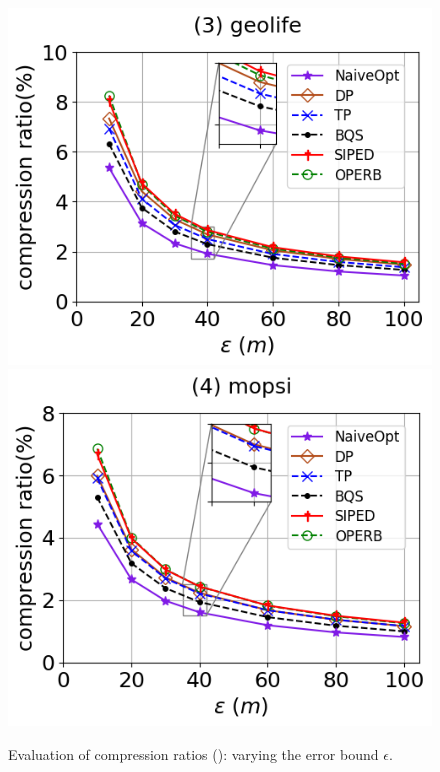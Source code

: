 \begin{figure}[tb!]
	\includegraphics[scale=0.315]{Figures/Exp-PED-CR-epsilon-geolife.png}	\hspace{1ex}
	\includegraphics[scale=0.315]{Figures/Exp-PED-CR-epsilon-mopsi.png}		
	\vspace{-3ex}
	\caption{\small Evaluation of compression ratios (\ped): varying the error bound $\epsilon$.}
	\label{fig:cr-ped-epsilon}
	\vspace{-2ex}
\end{figure}

